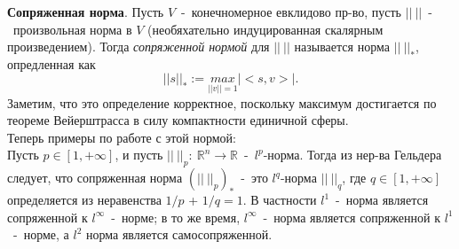\textbf{Сопряженная норма}. Пусть $V$~-~конечномерное евклидово пр-во, пусть $||~||$~-~произвольная норма в $V$ (необяхательно индуцированная скалярным произведением). Тогда \textit{сопряженной нормой} для $||~||$ называется норма $||~||_*$, опредленная как
$$
||s||_*:=\underset{||v||=1}{max}|<s,v>|.
$$
Заметим, что это определение корректное, поскольку максимум достигается по теореме Вейерштрасса в силу компактности единичной сферы.\\
Теперь примеры по работе с этой нормой:\\

Пусть $p \in [1,+\infty]$, и пусть $||~||_p:~\mathbb{R}^n \to \mathbb{R}$~-~$l^p$-норма. Тогда из нер-ва Гельдера следует, что сопряженная норма $(||~||_p)_*$~-~это $l^q$-норма $||~||_q$, где $q \in [1, +\infty]$ определяется из неравенства $1/p$ + $1/q=1$. В частности $l^1$~-~норма является сопряженной к $l^{\infty}$~-~норме; в то же время, $l^{\infty}$~-~норма является сопряженной к $l^1$~-~норме, а $l^2$ норма является самосопряженной.